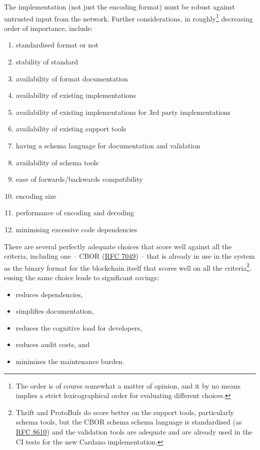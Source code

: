 \documentclass[11pt,a4paper]{article}
\begin{document}
The implementation (not just the encoding format) must be robust against
untrusted input from the network. Further considerations, in
roughly\footnote{The order is of course somewhat a matter of opinion,
  and it by no means implies a strict lexicographical order for
  evaluating different choices.} decreasing order of importance,
include:

\begin{enumerate}
\item
  standardised format or not
\item
  stability of standard
\item
  availability of format documentation
\item
  availability of existing implementations
\item
  availability of existing implementations for 3rd party implementations
\item
  availability of existing support tools
\item
  having a schema language for documentation and validation
\item
  availability of schema tools
\item
  ease of forwards/backwards compatibility
\item
  encoding size
\item
  performance of encoding and decoding
\item
  minimising excessive code dependencies
\end{enumerate}

There are several perfectly adequate choices that score well against all
the criteria, including one -- CBOR
(\href{https://tools.ietf.org/html/rfc7049}{{RFC 7049}}) -- that is
already in use in the system as the binary format for the blockchain
itself that scores well on all the criteria\footnote{Thrift and
  ProtoBufs do score better on the support tools, particularly schema
  tools, but the CBOR schema schema language is standardised (as
  \href{https://tools.ietf.org/html/rfc8610}{{RFC 8610}}) and the
  validation tools are adequate and are already used in the CI tests for
  the new Cardano implementation.}. eusing the same choice leads to
significant savings:

\begin{itemize}
\item
  reduces dependencies,
\item
  simplifies documentation,
\item
  reduces the cognitive load for developers,
\item
  reduces audit costs, and
\item
  minimises the maintenance burden.
\end{itemize}
\end{document}
